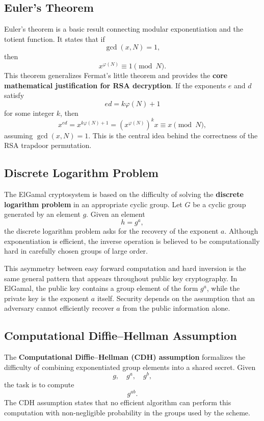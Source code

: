 \subsection{Euler's Theorem}

Euler's theorem is a basic result connecting modular exponentiation and the totient function. It states that if
\[
\gcd(x,N) = 1,
\]
then
\[
x^{\varphi(N)} \equiv 1 \pmod{N}.
\]
This theorem generalizes Fermat's little theorem and provides the \textbf{core mathematical justification for RSA decryption}. If the exponents $e$ and $d$ satisfy
\[
ed = k\varphi(N) + 1
\]
for some integer $k$, then
\[
x^{ed} = x^{k\varphi(N)+1} = \left(x^{\varphi(N)}\right)^k x \equiv x \pmod{N},
\]
assuming $\gcd(x,N)=1$. This is the central idea behind the correctness of the RSA trapdoor permutation.

\subsection{Discrete Logarithm Problem}

The ElGamal cryptosystem is based on the difficulty of solving the \textbf{discrete logarithm problem} in an appropriate cyclic group. Let $G$ be a cyclic group generated by an element $g$. Given an element
\[
h = g^a,
\]
the discrete logarithm problem asks for the recovery of the exponent $a$. Although exponentiation is efficient, the inverse operation is believed to be computationally hard in carefully chosen groups of large order.

This asymmetry between easy forward computation and hard inversion is the same general pattern that appears throughout public key cryptography. In ElGamal, the public key contains a group element of the form $g^a$, while the private key is the exponent $a$ itself. Security depends on the assumption that an adversary cannot efficiently recover $a$ from the public information alone.

\subsection{Computational Diffie--Hellman Assumption}

The \textbf{Computational Diffie--Hellman (CDH) assumption} formalizes the difficulty of combining exponentiated group elements into a shared secret. Given
\[
g, \quad g^a, \quad g^b,
\]
the task is to compute
\[
g^{ab}.
\]
The CDH assumption states that no efficient algorithm can perform this computation with non-negligible probability in the groups used by the scheme.


